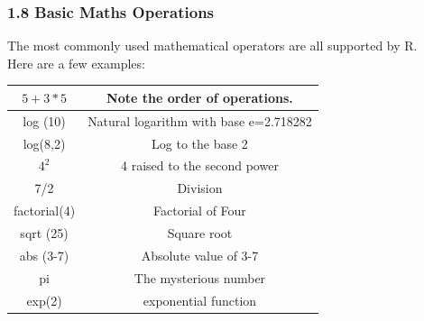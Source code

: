 \documentclass{beamer}
\begin{document}
 \begin{frame}
 	
 	\frametitle{1.8 Basic Maths Operations}
 	The most commonly used mathematical operators are all supported by R. \\Here are a few
 	examples:
 	\begin{tabular}{|c|c|}
 		$5 + 3 \ast 5$ &  Note the order of operations.\\\hline
 		log (10) & Natural logarithm with base e=2.718282 \\\hline
 		log(8,2) & Log to the base 2 \\\hline
 		$4^2$ & 4 raised to the second power \\\hline
 		7/2 & Division \\\hline
 		factorial(4) & Factorial of Four \\\hline
 		sqrt (25) & Square root \\\hline
 		abs (3-7) & Absolute value of 3-7 \\\hline
 		pi & The mysterious number \\\hline
 		exp(2) & exponential function \\\hline
 		
 	\end{tabular} 
 \end{frame}
 
\end{document}

